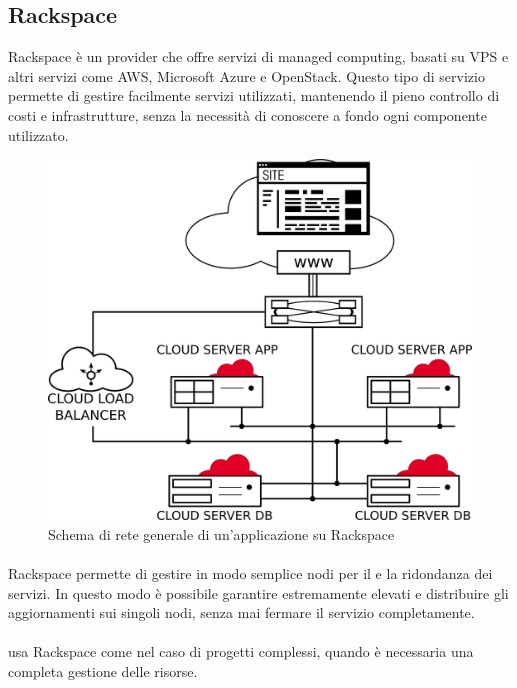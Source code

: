    \subsection{Rackspace}
   Rackspace è un  provider che offre servizi di managed  computing, basati su \gls{VPS} e altri servizi   come \gls{AWS}, Microsoft Azure e OpenStack. Questo tipo di servizio permette di gestire facilmente servizi  utilizzati, mantenendo il pieno controllo di costi e infrastrutture, senza la necessità di conoscere a fondo ogni componente utilizzato.
   \begin{figure}[H]
      \begin{center}
      \includegraphics[width=16.5cm,keepaspectratio]{immagini/rackspace-network}
      \end{center}
      \caption{Schema di rete generale di un'applicazione su Rackspace}
   \end{figure}
   \paragraph*{} Rackspace permette di gestire in modo semplice nodi per il  e la ridondanza dei servizi. In questo modo è possibile garantire  estremamente elevati e distribuire gli aggiornamenti sui singoli nodi, senza mai fermare il servizio completamente.
   \paragraph*{}
   \nomeAzienda{} usa Rackspace come  nel caso di progetti complessi, quando è necessaria una completa gestione delle risorse.

